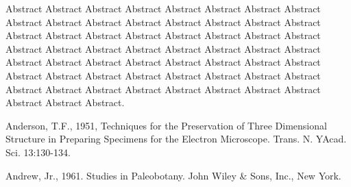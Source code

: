 \documentclass{uinsaintekskripsi}
\begin{document}
\begin{abstracteng}
Abstract Abstract Abstract Abstract Abstract Abstract Abstract Abstract Abstract Abstract Abstract Abstract Abstract Abstract Abstract Abstract Abstract Abstract Abstract Abstract Abstract Abstract Abstract Abstract Abstract Abstract Abstract Abstract Abstract Abstract Abstract Abstract Abstract Abstract Abstract Abstract Abstract Abstract Abstract Abstract Abstract Abstract Abstract Abstract Abstract Abstract Abstract Abstract Abstract Abstract Abstract Abstract Abstract Abstract Abstract Abstract Abstract Abstract Abstract.
\end{abstracteng}







\begin{thebibliography}{99}
Anderson,  T.F., 1951, Techniques  for  the  Preservation  of  Three
Dimensional  Structure  in  Preparing  Specimens  for  the  Electron
Microscope. Trans. N. YAcad. Sci. 13:130-134.

Andrew, Jr., 1961. Studies in Paleobotany. John Wiley \& Sons, Inc., New
York.
\end{thebibliography}


\appendix
\end{document}
